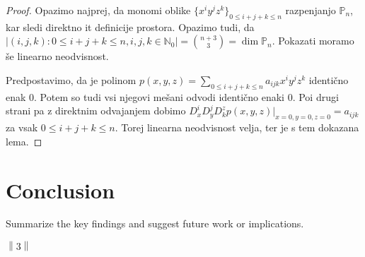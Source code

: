 \documentclass[11pt,a4paper]{article}
\begin{document}
\begin{proof}
    Opazimo najprej, da monomi oblike $\{x^i y^j z^k\}_{0 \le i  + j + k \le n}$
    razpenjanjo $\mathbb{P}_n$, kar sledi direktno it definicije 
    prostora. Opazimo tudi, da 
    $|\left(i, j , k\right): 0\le i+j+k \le n , i,j,k \in \mathbb{N}_0| = \binom{n+3}{3} = \dim\mathbb{P}_n$.
    Pokazati moramo še linearno neodvisnost.  

    Predpostavimo, da je polinom $p(x,y,z) =\sum_{0 \le i  + j + k \le n} a_{ijk} x^i y^j z^k $
    identično enak 0. Potem so tudi vsi njegovi mešani odvodi identično enaki 0.
    Poi drugi strani pa z direktnim odvajanjem dobimo
    $D^i_xD^j_yD^z_k p(x,y,z)|_{x =0 ,y =0, z = 0} = a_{ijk}$ za vsak 
    $0 \le i  + j + k \le n$. Torej linearna neodvisnost velja, ter
    je s tem dokazana lema.
\end{proof}



\section{Conclusion}
Summarize the key findings and suggest future work or implications.

% 
% 

$\left\lVert 3 \right\rVert$ 
\end{document}
